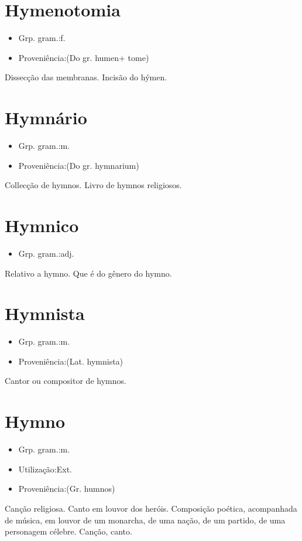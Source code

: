\documentclass{article}
\begin{document}
\section{Hymenotomia}
\begin{itemize}
\item {Grp. gram.:f.}
\end{itemize}
\begin{itemize}
\item {Proveniência:(Do gr. \textunderscore humen\textunderscore  + \textunderscore tome\textunderscore )}
\end{itemize}
Dissecção das membranas.
Incisão do hýmen.
\section{Hymnário}
\begin{itemize}
\item {Grp. gram.:m.}
\end{itemize}
\begin{itemize}
\item {Proveniência:(Do gr. \textunderscore hymnarium\textunderscore )}
\end{itemize}
Collecção de hymnos.
Livro de hymnos religiosos.
\section{Hymnico}
\begin{itemize}
\item {Grp. gram.:adj.}
\end{itemize}
Relativo a hymno.
Que é do gênero do hymno.
\section{Hymnista}
\begin{itemize}
\item {Grp. gram.:m.}
\end{itemize}
\begin{itemize}
\item {Proveniência:(Lat. \textunderscore hymnista\textunderscore )}
\end{itemize}
Cantor ou compositor de hymnos.
\section{Hymno}
\begin{itemize}
\item {Grp. gram.:m.}
\end{itemize}
\begin{itemize}
\item {Utilização:Ext.}
\end{itemize}
\begin{itemize}
\item {Proveniência:(Gr. \textunderscore humnos\textunderscore )}
\end{itemize}
Canção religiosa.
Canto em louvor dos heróis.
Composição poética, acompanhada de música, em louvor de um monarcha, de uma nação, de um partido, de uma personagem célebre.
Canção, canto.
\end{document}
